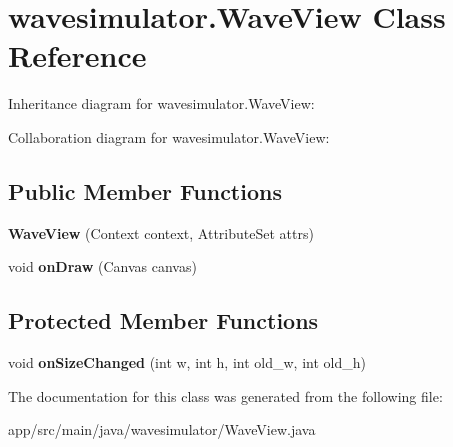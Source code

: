 \hypertarget{classwavesimulator_1_1WaveView}{}\section{wavesimulator.\+Wave\+View Class Reference}
\label{classwavesimulator_1_1WaveView}


Inheritance diagram for wavesimulator.\+Wave\+View\+:


Collaboration diagram for wavesimulator.\+Wave\+View\+:
\subsection*{Public Member Functions}
\begin{DoxyCompactItemize}
\item 
\mbox{\label{classwavesimulator_1_1WaveView_a9ec88e17333db01de8637efedf66fa1b}} 
{\bfseries Wave\+View} (Context context, Attribute\+Set attrs)
\item 
\mbox{\label{classwavesimulator_1_1WaveView_a2c9aa15893e998681246c9c9ae0de77f}} 
void {\bfseries on\+Draw} (Canvas canvas)
\end{DoxyCompactItemize}
\subsection*{Protected Member Functions}
\begin{DoxyCompactItemize}
\item 
\mbox{\label{classwavesimulator_1_1WaveView_ad7e6b1acf6ec2359283332d6dd86b901}} 
void {\bfseries on\+Size\+Changed} (int w, int h, int old\+\_\+w, int old\+\_\+h)
\end{DoxyCompactItemize}


The documentation for this class was generated from the following file\+:\begin{DoxyCompactItemize}
\item 
app/src/main/java/wavesimulator/Wave\+View.\+java\end{DoxyCompactItemize}
